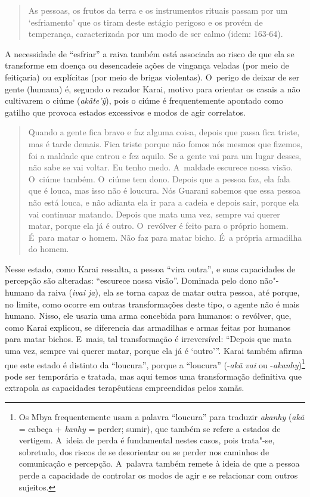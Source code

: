 \begin{quote}
\noindent
As pessoas, os frutos da terra e os instrumentos rituais passam por um
‘esfriamento’ que os tiram deste estágio perigoso e os provém de
temperança, caracterizada por um modo de ser calmo (idem: 163-64). 
\end{quote}


A necessidade de ``esfriar'' a raiva também está associada ao risco de que
ela se transforme em doença ou desencadeie ações de vingança veladas
(por meio de feitiçaria) ou explícitas (por meio de brigas violentas).
O~perigo de deixar de ser gente (humana) é, segundo o rezador Karai,
motivo para orientar os casais a não cultivarem o ciúme
(\emph{akãte’ỹ}), pois o ciúme é frequentemente apontado como gatilho
que provoca estados excessivos e modos de agir correlatos. 

\begin{quote}
\noindent
Quando a gente fica bravo e faz alguma coisa, depois que passa fica
triste, mas é tarde demais. Fica triste porque não fomos nós mesmos que
fizemos, foi a maldade que entrou e fez aquilo. Se a gente vai para um
lugar desses, não sabe se vai voltar. Eu tenho medo. A~maldade escurece
nossa visão. O~ciúme também. O~ciúme tem dono. Depois que a pessoa faz,
ela fala que é louca, mas isso não é loucura. Nós Guarani sabemos que
essa pessoa não está louca, e não adianta ela ir para a cadeia e depois
sair, porque ela vai continuar matando. Depois que mata uma vez, sempre
vai querer matar, porque ela já é outro. O~revólver é feito para o
próprio homem. É~para matar o homem. Não faz para matar bicho. É~a
própria armadilha do homem.
\end{quote}

\indent
Nesse estado, como Karai ressalta, a pessoa ``vira outra'', e suas
capacidades de percepção são alteradas: ``escurece nossa visão''.
Dominada pelo dono não"-humano da raiva (\emph{ivai ja}), ela se torna capaz de
matar outra pessoa, até porque, no limite, como ocorre em outras
transformações deste tipo, o agente não é mais humano. Nisso, ele
usaria uma arma concebida para humanos: o revólver, que, como Karai
explicou, se diferencia das armadilhas e armas feitas por humanos para
matar bichos. E~mais, tal transformação é irreversível: ``Depois que
mata uma vez, sempre vai querer matar, porque ela já é ‘outro’''. Karai
também afirma que este estado é distinto da ``loucura'', porque a
``loucura'' (-\emph{akã vai} ou -\emph{akanhy})\footnote[10]{Os Mbya frequentemente usam
a palavra ``loucura'' para traduzir \emph{akanhy} (\emph{akã} = cabeça + \emph{kanhy} =
perder; sumir), que também se refere a estados de vertigem. A~ideia de
perda é fundamental nestes casos, pois trata"-se, sobretudo, dos riscos
de se desorientar ou se perder nos caminhos de comunicação e percepção.
A~palavra também remete à ideia de que a pessoa perde a capacidade de
controlar os modos de agir e se relacionar com outros sujeitos.} pode
ser temporária e tratada, mas aqui temos uma transformação definitiva
que extrapola as capacidades terapêuticas empreendidas pelos xamãs. 

